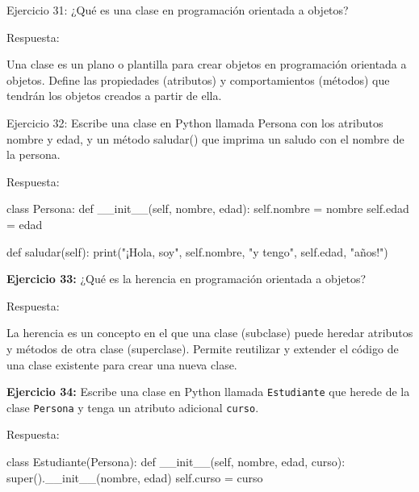 \documentclass[
  a4paper,
  DIV=11,
  numbers=noendperiod,
  onepage,
  openany]{scrreprt}
\newenvironment{Shaded}{\begin{snugshade}}{\end{snugshade}}
\newcommand{\BuiltInTok}[1]{\textcolor[rgb]{0.00,0.23,0.31}{#1}}
\newcommand{\FunctionTok}[1]{\textcolor[rgb]{0.28,0.35,0.67}{#1}}
\newcommand{\KeywordTok}[1]{\textcolor[rgb]{0.00,0.23,0.31}{#1}}
\newcommand{\NormalTok}[1]{\textcolor[rgb]{0.00,0.23,0.31}{#1}}
\newcommand{\OperatorTok}[1]{\textcolor[rgb]{0.37,0.37,0.37}{#1}}
\newcommand{\StringTok}[1]{\textcolor[rgb]{0.13,0.47,0.30}{#1}}
\newcommand{\VariableTok}[1]{\textcolor[rgb]{0.07,0.07,0.07}{#1}}
\begin{document}
Ejercicio 31: ¿Qué es una clase en programación orientada a objetos?

Respuesta:

Una clase es un plano o plantilla para crear objetos en programación
orientada a objetos. Define las propiedades (atributos) y
comportamientos (métodos) que tendrán los objetos creados a partir de
ella.

Ejercicio 32: Escribe una clase en Python llamada Persona con los
atributos nombre y edad, y un método saludar() que imprima un saludo con
el nombre de la persona.

Respuesta:

\begin{Shaded}
\begin{Highlighting}[]
\KeywordTok{class}\NormalTok{ Persona:}
    \KeywordTok{def} \FunctionTok{\_\_init\_\_}\NormalTok{(}\VariableTok{self}\NormalTok{, nombre, edad):}
        \VariableTok{self}\NormalTok{.nombre }\OperatorTok{=}\NormalTok{ nombre}
        \VariableTok{self}\NormalTok{.edad }\OperatorTok{=}\NormalTok{ edad}
\end{Highlighting}
\end{Shaded}

\begin{Shaded}
\begin{Highlighting}[]
\KeywordTok{def}\NormalTok{ saludar(}\VariableTok{self}\NormalTok{):}
    \BuiltInTok{print}\NormalTok{(}\StringTok{"¡Hola, soy"}\NormalTok{, }\VariableTok{self}\NormalTok{.nombre, }\StringTok{"y tengo"}\NormalTok{, }\VariableTok{self}\NormalTok{.edad, }\StringTok{"años!"}\NormalTok{)}
\end{Highlighting}
\end{Shaded}

\textbf{Ejercicio 33:} ¿Qué es la herencia en programación orientada a
objetos?

Respuesta:

La herencia es un concepto en el que una clase (subclase) puede heredar
atributos y métodos de otra clase (superclase). Permite reutilizar y
extender el código de una clase existente para crear una nueva clase.

\textbf{Ejercicio 34:} Escribe una clase en Python llamada
\texttt{Estudiante} que herede de la clase \texttt{Persona} y tenga un
atributo adicional \texttt{curso}.

Respuesta:

\begin{Shaded}
\begin{Highlighting}[]
\KeywordTok{class}\NormalTok{ Estudiante(Persona):}
    \KeywordTok{def} \FunctionTok{\_\_init\_\_}\NormalTok{(}\VariableTok{self}\NormalTok{, nombre, edad, curso):}
        \BuiltInTok{super}\NormalTok{().}\FunctionTok{\_\_init\_\_}\NormalTok{(nombre, edad)}
        \VariableTok{self}\NormalTok{.curso }\OperatorTok{=}\NormalTok{ curso}
\end{Highlighting}
\end{Shaded}
\end{document}
